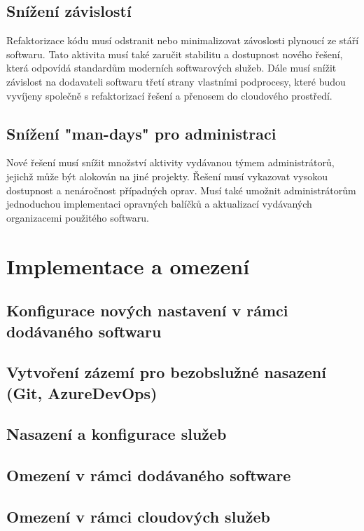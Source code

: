 \documentclass[12pt]{article}
\begin{document}
\begin{sloppypar}
\begin{spacing}{1.15}
        \subsection*{Snížení závislostí}
        Refaktorizace kódu musí odstranit nebo minimalizovat závoslosti plynoucí
        ze stáří softwaru. Tato aktivita musí také zaručit stabilitu a dostupnost
        nového řešení, která odpovídá standardům moderních softwarových služeb.
        Dále musí snížit závislost na dodavateli softwaru třetí strany vlastními
        podprocesy, které budou vyvíjeny společně s refaktorizací řešení a
        přenosem do cloudového prostředí.

        \subsection*{Snížení "man-days" pro administraci}
        Nové řešení musí snížit množství aktivity vydávanou týmem
        administrátorů, jejichž může být alokován na jiné projekty. Řešení musí
        vykazovat vysokou dostupnost a nenáročnost případných oprav. Musí také
        umožnit administrátorům jednoduchou implementaci opravných balíčků a
        aktualizací vydávaných organizacemi použitého softwaru. 

        \section*{Implementace a omezení}
        \subsection*{Konfigurace nových nastavení v rámci dodávaného softwaru}

        \subsection*{Vytvoření zázemí pro bezobslužné nasazení (Git, AzureDevOps)}

        \subsection*{Nasazení a konfigurace služeb}
        
        \subsection*{Omezení v rámci dodávaného software}

        \subsection*{Omezení v rámci cloudových služeb}
        

\end{spacing}
\end{sloppypar}
\end{document}
